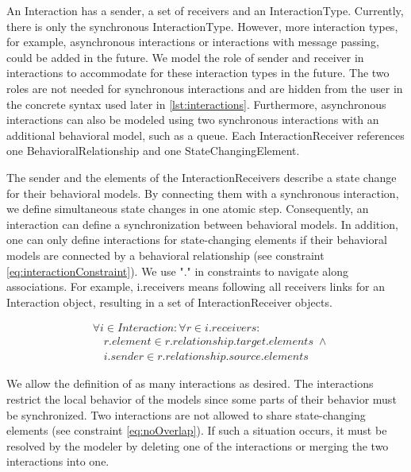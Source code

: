 \documentclass{jot}
\begin{document}
An \textsf{Interaction} has a \textsf{sender}, a set of \textsf{receivers} and an \textsf{InteractionType}.
Currently, there is only the \textsf{synchronous} \textsf{InteractionType}.
However, more interaction types, for example, asynchronous interactions or interactions with message passing, could be added in the future.
We model the role of sender and receiver in interactions to accommodate for these interaction types in the future.
The two roles are not needed for synchronous interactions and are hidden from the user in the concrete syntax used later in \cref{lst:interactions}.
Furthermore, asynchronous interactions can also be modeled using two synchronous interactions with an additional behavioral model, such as a queue.
Each \textsf{InteractionReceiver} references one \textsf{BehavioralRelationship} and one \textsf{StateChangingElement}.

The \textsf{sender} and the elements of the \textsf{InteractionReceiver}s describe a state change for their behavioral models.
By connecting them with a synchronous interaction, we define simultaneous state changes in one atomic step. 
Consequently, an interaction can define a synchronization between behavioral models.
In addition, one can only define interactions for state-changing elements if their behavioral models are connected by a behavioral relationship (see constraint \eqref{eq:interactionConstraint}).
We use "." in constraints to navigate along associations.
For example, \textsf{i.receivers} means following all \textsf{receivers} links for an \textsf{Interaction} object, resulting in a set of \textsf{InteractionReceiver} objects.

\begin{equation} \label{eq:interactionConstraint}
    \begin{aligned}
    & \forall i \in Interaction: \forall r \in i.receivers : \\
    & \quad r.element \in r.relationship.target.elements \; \wedge \\
    & \quad i.sender \in r.relationship.source.elements
    \end{aligned}
\end{equation}

We allow the definition of as many interactions as desired.
The interactions restrict the local behavior of the models since some parts of their behavior must be synchronized.
Two interactions are not allowed to share state-changing elements (see constraint \eqref{eq:noOverlap}).
If such a situation occurs, it must be resolved by the modeler by deleting one of the interactions or merging the two interactions into one.
\end{document}
